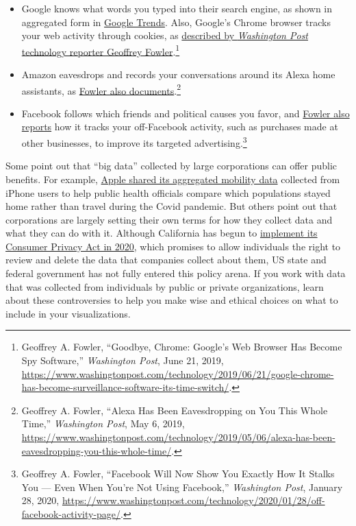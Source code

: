 \documentclass[
  english,
]{book}
\providecommand{\tightlist}{%
  \setlength{\itemsep}{0pt}\setlength{\parskip}{0pt}}
\begin{document}
\begin{itemize}
\tightlist
\item
  Google knows what words you typed into their search engine, as shown in aggregated form in \href{https://trends.google.com/trends/}{Google Trends}. Also, Google's Chrome browser tracks your web activity through cookies, as \href{https://www.washingtonpost.com/technology/2019/06/21/google-chrome-has-become-surveillance-software-its-time-switch/}{described by \emph{Washington Post} technology reporter Geoffrey Fowler}.\footnote{Geoffrey A. Fowler, {``Goodbye, {Chrome}: {Google}'s {Web Browser Has Become Spy Software},''} \emph{Washington Post}, June 21, 2019, \url{https://www.washingtonpost.com/technology/2019/06/21/google-chrome-has-become-surveillance-software-its-time-switch/}.}
\item
  Amazon eavesdrops and records your conversations around its Alexa home assistants, as \href{https://www.washingtonpost.com/technology/2019/05/06/alexa-has-been-eavesdropping-you-this-whole-time/}{Fowler also documents}.\footnote{Geoffrey A. Fowler, {``Alexa {Has Been Eavesdropping} on {You This Whole Time},''} \emph{Washington Post}, May 6, 2019, \url{https://www.washingtonpost.com/technology/2019/05/06/alexa-has-been-eavesdropping-you-this-whole-time/}.}
\item
  Facebook follows which friends and political causes you favor, and \href{https://www.washingtonpost.com/technology/2020/01/28/off-facebook-activity-page/}{Fowler also reports} how it tracks your off-Facebook activity, such as purchases made at other businesses, to improve its targeted advertising.\footnote{Geoffrey A. Fowler, {``Facebook {Will Now Show You Exactly How It Stalks You} --- {Even When You}'re {Not Using Facebook},''} \emph{Washington Post}, January 28, 2020, \url{https://www.washingtonpost.com/technology/2020/01/28/off-facebook-activity-page/}.}
\end{itemize}

Some point out that ``big data'' collected by large corporations can offer public benefits. For example, \href{https://covid19.apple.com/mobility}{Apple shared its aggregated mobility data} collected from iPhone users to help public health officials compare which populations stayed home rather than travel during the Covid pandemic. But others point out that corporations are largely setting their own terms for how they collect data and what they can do with it. Although California has begun to \href{https://www.washingtonpost.com/technology/2020/01/21/ccpa-transparency/}{implement its Consumer Privacy Act in 2020}, which promises to allow individuals the right to review and delete the data that companies collect about them, US state and federal government has not fully entered this policy arena. If you work with data that was collected from individuals by public or private organizations, learn about these controversies to help you make wise and ethical choices on what to include in your visualizations.
\end{document}
